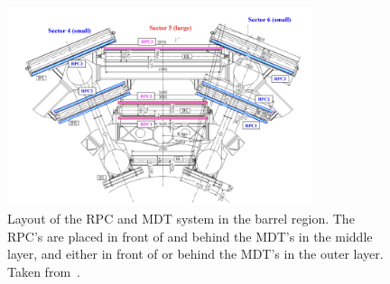 \begin{figure}[htp]
    \centering
    \includegraphics[width=0.8\textwidth]{figures/atlas/atlas_mdt_rpc_sandwich.png}
    \caption{Layout of the RPC and MDT system in the barrel region. The RPC's are placed in front of and behind the MDT's in the middle layer, and either in front of or behind the MDT's in the outer layer. Taken from~\cite{atlas_collaboration_paper}.}\label{fig:atlas_mdt_rpc_sandwich}
\end{figure}
